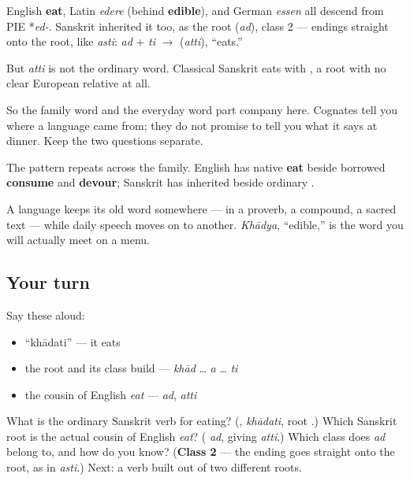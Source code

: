 \begin{grammarlens}[title={Grammar Lens: the everyday word and the related word}]
English \textbf{eat}, Latin \emph{edere} (behind \textbf{edible}), and German \emph{essen} all descend from PIE *\emph{ed-}. Sanskrit inherited it too, as the root \textbf{} (\emph{ad}), class 2 — endings straight onto the root, like \emph{asti}: \emph{ad} + \emph{ti} $\to$ \textbf{} (\emph{atti}), \textquotedblleft{}eats.\textquotedblright{}

But \emph{atti} is not the ordinary word. Classical Sanskrit eats with \textbf{}, a root with no clear European relative at all.

So the family word and the everyday word part company here. Cognates tell you where a language came from; they do not promise to tell you what it says at dinner. Keep the two questions separate.
\end{grammarlens}

\begin{cousinweb}
The pattern repeats across the family. English has native \textbf{eat} beside borrowed \textbf{consume} and \textbf{devour}; Sanskrit has inherited \textbf{} beside ordinary \textbf{}.

A language keeps its old word somewhere — in a proverb, a compound, a sacred text — while daily speech moves on to another. \emph{Khādya}, \textquotedblleft{}edible,\textquotedblright{} is the word you will actually meet on a menu.
\end{cousinweb}

\subsection*{Your turn}
Say these aloud:

\begin{itemize}
\raggedright
  \item \textquotedblleft{}khādati\textquotedblright{} — it eats
  \item the root and its class build — \emph{khād} … \emph{a} … \emph{ti}
  \item the cousin of English \emph{eat} — \emph{ad}, \emph{atti}
\end{itemize}

\begin{tcolorbox}[breakable,colback=teal!4,colframe=teal!35!black,title={Before you move on}]
What is the ordinary Sanskrit verb for eating? (\textbf{}, \emph{khādati}, root \textbf{}.) Which Sanskrit root is the actual cousin of English \emph{eat}? (\textbf{} \emph{ad}, giving \emph{atti}.) Which class does \emph{ad} belong to, and how do you know? (\textbf{Class 2} — the ending goes straight onto the root, as in \emph{asti}.) Next: a verb built out of two different roots.
\end{tcolorbox}
